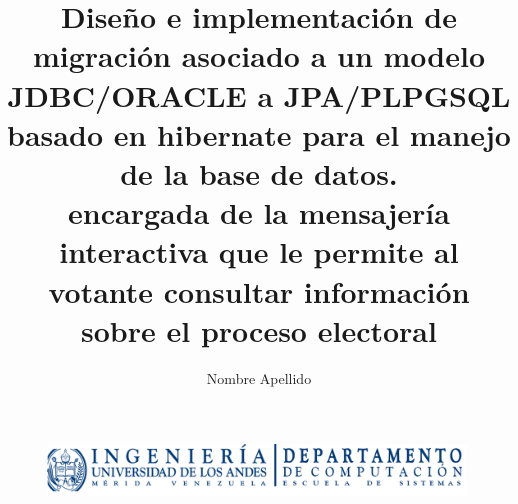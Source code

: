 \documentclass[spanish]{article}
\title{Diseño e implementación de migración asociado a un modelo JDBC/ORACLE a JPA/PLPGSQL basado en hibernate para el manejo de la base de datos.\\encargada de la mensajería interactiva que le permite al votante consultar información sobre el proceso electoral}
\author{Nombre Apellido}
\begin{document}
\begin{figure}
  \centering
    \includegraphics[width=0.99\textwidth]{Logo_computacion}
\end{figure}

\maketitle
\end{document}
